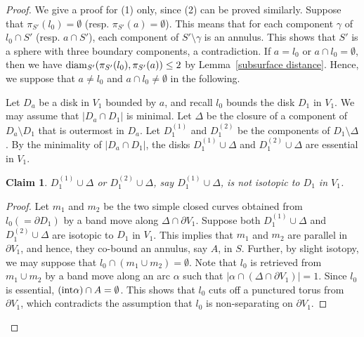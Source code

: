 \documentclass[]{aspm}
\newtheorem{claim}[definition]{Claim}
\begin{document}
\begin{proof}
We give a proof for (1) only, since (2) can be proved similarly.
Suppose that $\pi_{S'}(l_0)=\emptyset$ (resp. $\pi_{S'}(a)=\emptyset$). 
This means that for each component $\gamma$ of $l_{0}\cap S'$ (resp. $a\cap S'$), each component of $S'\setminus\gamma$ is an annulus. 
This shows that $S'$ is a sphere with three boundary components, a contradiction. 
If $a=l_0$ or $a\cap l_0=\emptyset$, then we have ${\rm diam}_{S'}(\pi_{S'}(l_0), \pi_{S'}(a))\leq 2$ by Lemma~\ref{subsurface distance}.
Hence, we suppose that $a\ne l_0$ and $a\cap l_0\ne\emptyset$ in the following.

Let $D_a$ be a disk in $V_1$ bounded by $a$, and recall $l_0$ bounds the disk $D_1$ in $V_1$.
We may assume that $|D_a\cap D_1|$ is minimal.
Let $\Delta$ be the closure of a component of $D_a\setminus D_1$ that is outermost in $D_a$.
Let $D_1^{(1)}$ and $D_1^{(2)}$ be the components of $D_1\setminus \Delta$.
By the minimality of $|D_a\cap D_1|$, the disks $D_1^{(1)}\cup \Delta$ and $D_1^{(2)}\cup \Delta$ are essential in $V_1$. 

\begin{claim}
$D_1^{(1)}\cup \Delta$ or $D_1^{(2)}\cup \Delta$, say $D_1^{(1)}\cup \Delta$, is not isotopic to $D_1$ in $V_1$.
\end{claim}

\begin{proof}
Let $m_1$ and $m_2$ be the two simple closed curves obtained from $l_0(=\partial D_1)$ by a band move along $\Delta\cap \partial V_1$.
Suppose both $D_1^{(1)}\cup \Delta$ and $D_1^{(2)}\cup \Delta$ are isotopic to $D_1$ in $V_1$.
This implies that $m_1$ and $m_2$ are parallel in $\partial V_1$, and hence, they co-bound  an annulus, say $A$, in $S$.
Further, by slight isotopy, we may suppose that $l_0\cap (m_1\cup m_2)=\emptyset$.
Note that $l_0$ is retrieved from $m_1\cup m_2$ by a band move along an arc $\alpha$ such that $|\alpha\cap (\Delta\cap \partial V_1)|=1$.
Since $l_0$ is essential, $({\rm int} \alpha)\cap A=\emptyset$.
This shows that $l_0$ cuts off a punctured torus from $\partial V_1$, which contradicts the assumption that $l_0$ is non-separating on $\partial V_1$.
\end{proof}


\end{proof}
\end{document}
